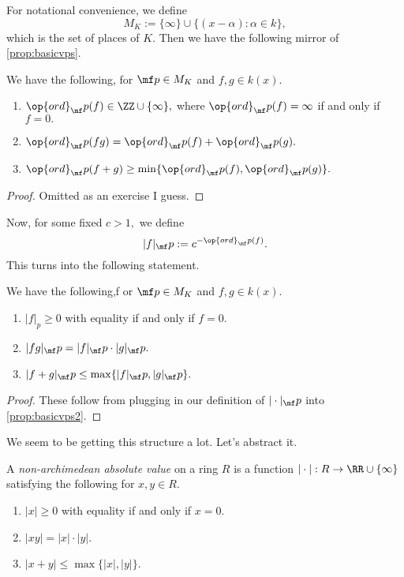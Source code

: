 For notational convenience, we define
\[M_K:=\{\infty\}\cup\{(x-\alpha):\alpha\in k\},\]
which is the set of places of $K.$ Then we have the following mirror of \autoref{prop:basicvps}.
\begin{proposition} \label{prop:basicvps2}
	We have the following, for $\mf p\in M_K$ and $f,g\in k(x).$
	\begin{enumerate}[label=(\alph*)]
		\item $\op{ord}_\mf p(f)\in\ZZ\cup\{\infty\},$ where $\op{ord}_\mf p(f)=\infty$ if and only if $f=0.$
		\item $\op{ord}_\mf p(fg)=\op{ord}_\mf p(f)+\op{ord}_\mf p(g).$
		\item $\op{ord}_\mf p(f+g)\ge\min\{\op{ord}_\mf p(f),\op{ord}_\mf p(g)\}.$
	\end{enumerate}
\end{proposition}
\begin{proof}
	Omitted as an exercise I guess.\todo{}
\end{proof}
Now, for some fixed $c>1,$ we define
\[|f|_\mf p:=c^{-\op{ord}_\mf p(f)}.\]
This turns into the following statement.
\begin{corollary}
	We have the following,f or $\mf p\in M_K$ and $f,g\in k(x).$
	\begin{enumerate}[label=(\alph*)]
		\item $|f|_p\ge0$ with equality if and only if $f=0.$
		\item $|fg|_\mf p=|f|_\mf p\cdot|g|_\mf p.$
		\item $|f+g|_\mf p\le\max\{|f|_\mf p,|g|_\mf p\}.$
	\end{enumerate}
\end{corollary}
\begin{proof}
	These follow from plugging in our definition of $|\cdot|_\mf p$ into \autoref{prop:basicvps2}.
\end{proof}
We seem to be getting this structure a lot. Let's abstract it.
\begin{definition}
	A \textit{non-archimedean absolute value} on a ring $R$ is a function $|\cdot|:R\to\RR\cup\{\infty\}$ satisfying the following for $x,y\in R.$
	\begin{enumerate}
		\item $|x|\ge0$ with equality if and only if $x=0.$
		\item $|xy|=|x|\cdot|y|.$
		\item $|x+y|\le\max\{|x|,|y|\}.$
	\end{enumerate}
\end{definition}
